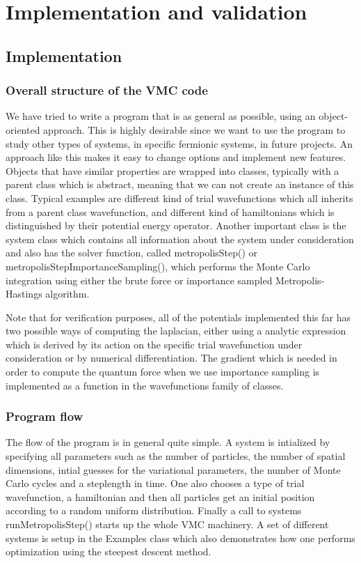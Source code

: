 \documentclass[a4paper,10pt]{article}
\begin{document}
\section{Implementation and validation}
\subsection{Implementation}
\subsubsection{Overall structure of the VMC code}
We have tried to write a program that is as general as possible, using an object-oriented approach. This is highly 
desirable since we want to use the program to study other types of systems, in specific fermionic systems, in future projects.
An approach like this makes it easy to change options and implement new features. Objects that have similar properties are wrapped into
classes, typically with a parent class which is abstract, meaning that we can not create an instance of this class. Typical examples 
are different kind of trial wavefunctions which all inherits from a parent class wavefunction, and different kind of hamiltonians which
is distinguished by their potential energy operator. Another important class is the system class which contains all information about the
system under consideration and also has the solver function, called metropolisStep() or metropolisStepImportanceSampling(), which performs
the Monte Carlo integration using either the brute force or importance sampled Metropolis-Hastings algorithm.

Note that for verification purposes, all of the potentials implemented this far has two possible ways of computing the laplacian, either using a analytic expression
which is derived by its action on the specific trial wavefunction under consideration or by numerical differentiation. The gradient which is needed
in order to compute the quantum force when we use importance sampling is implemented as a function in the wavefunctions family of classes.
\subsubsection{Program flow}
The flow of the program is in general quite simple. A system is intialized by specifying all parameters such as the number of particles,
the number of spatial dimensions, intial guesses for the variational parameters, the number of Monte Carlo cycles and a steplength in time. 
One also chooses a type of trial wavefunction, a hamiltonian and then all particles get an initial position according to a random uniform distribution. 
Finally a call to systems runMetropolisStep() starts up the whole VMC machinery. A set of different systems is setup in the Examples class which 
also demonstrates how one performs optimization using the steepest descent method.
\end{document}
